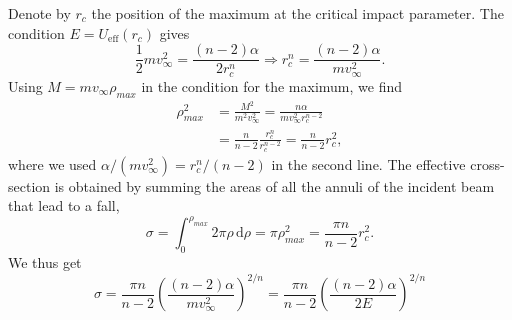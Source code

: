 \begin{problem}[title={Fall to the centre in a field \texorplain{$-\alpha/r^n$, $n > 2$}{−α/rⁿ, n > 2}}]
{Denote by $r_c$ the position of the maximum at the critical impact parameter. The condition $E = U_{\text{eff}}(r_c)$ gives
\begin{equation*}
    \frac{1}{2}mv_\infty^2 = \frac{(n-2)\alpha}{2r_c^n} \Rightarrow r_c^n = \frac{(n-2)\alpha}{mv_\infty^2}.
\end{equation*}
Using $M = mv_\infty\rho_{max}$ in the condition for the maximum, we find
\begin{align*}
    \rho_{max}^2 &= \frac{M^2}{m^2v_\infty^2} = \frac{n\alpha}{mv_\infty^2 r_c^{n-2}} \\
    &= \frac{n}{n-2}\frac{r_c^n}{r_c^{n-2}} = \frac{n}{n-2}r_c^2,
\end{align*}
where we used $\alpha/(mv_\infty^2) = r_c^n/(n-2)$ in the second line.
The effective cross-section is obtained by summing the areas of all the annuli of the incident beam that lead to a fall,
\begin{equation*}
    \sigma = \int_0^{\rho_{max}} 2\pi\rho\,\mathrm{d}\rho = \pi\rho_{max}^2 = \frac{\pi n}{n-2}r_c^2.
\end{equation*}
We thus get
}
{
\begin{equation*}
    \sigma = \frac{\pi n}{n-2}\left( \frac{(n-2)\alpha}{mv_\infty^2} \right)^{2/n} = \frac{\pi n}{n-2}\left( \frac{(n-2)\alpha}{2E} \right)^{2/n}
\end{equation*}
}
\end{problem}


